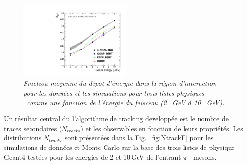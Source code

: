 \begin{figure}
	\centering
	\includegraphics[width=0.5\textwidth]{ECAL/plots/e-ir-graph.pdf}
	\caption{\label{fig:irgraphF} \sl  Fraction moyenne du dépôt d'énergie dans la région d'interaction pour les données et les simulations  pour trois listes physiques \geant\ comme une fonction de l'énergie du faisceau (2 \, GeV à 10 \, GeV).}
\end{figure}



Un résultat central du  l'algorithme de tracking developp\'ee est le nombre de traces secondaires ($N_ {tracks}$) et les observables en fonction de leurs propriétés.
Les distributions $N_ {tracks}$ sont présentées dans la Fig.~\ref{fig:NtrackF} pour les simulations de données et Monte Carlo sur la base des trois listes de physique {\sc Geant4} testées pour les énergies de 2 et 10\,GeV de l'entrant $\pi^-$-mesons.

